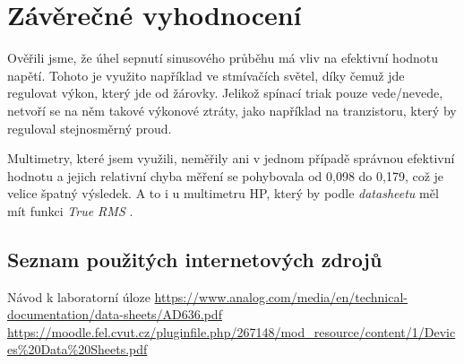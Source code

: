 \documentclass[a4paper,12pt]{article}   %
\begin{document}
\section{Závěrečné vyhodnocení}
Ověřili jsme, že úhel sepnutí sinusového průběhu má vliv na efektivní hodnotu napětí. Tohoto je využito například ve stmívačích světel, díky čemuž jde regulovat výkon, který jde od žárovky. Jelikož spínací triak pouze vede/nevede, netvoří se na něm takové výkonové ztráty, jako například na tranzistoru, který by reguloval stejnosměrný proud.

Multimetry, které jsem využili, neměřily ani v jednom případě správnou efektivní hodnotu a jejich relativní chyba měření se pohybovala od 0,098 do 0,179, což je velice špatný výsledek. A to i u multimetru HP, který by podle \textit{datasheetu} měl mít funkci \textit{True RMS} \cite{datasheet_multimetry}.


\clearpage
\renewcommand{\refname}{Seznam použité literatury a~zdrojů informací} 

\begin{thebibliography}{99}

\subsection*{Seznam použitých internetových zdrojů}
     Návod k laboratorní úloze
     \url{https://www.analog.com/media/en/technical-documentation/data-sheets/AD636.pdf}
     \url{https://moodle.fel.cvut.cz/pluginfile.php/267148/mod_resource/content/1/Devices%20Data%20Sheets.pdf}
    
\end{thebibliography}
\end{document}
